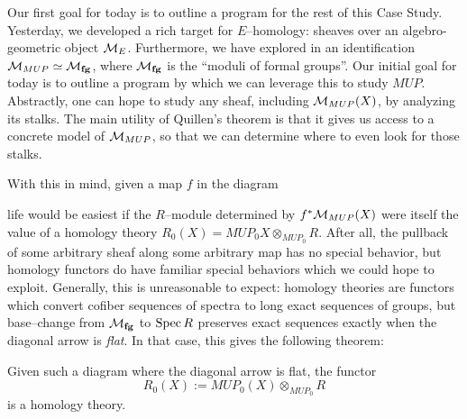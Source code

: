 Our first goal for today is to outline a program for the rest of this Case Study.  Yesterday, we developed a rich target for $E$--homology: sheaves over an algebro-geometric object $\mathcal{M}_{E}$.  Furthermore, we have explored in  an identification $\mathcal{M}_{MUP} \simeq \mathcal{M}_{\mathbf{fg}}$, where $\mathcal{M}_{\mathbf{fg}}$ is the ``moduli of formal groups''.  Our initial goal for today is to outline a program by which we can leverage this to study $MUP$.  Abstractly, one can hope to study any sheaf, including $\mathcal{M}_{MUP}(X)$, by analyzing its stalks.  The main utility of Quillen's theorem is that it gives us access to a concrete model of $\mathcal{M}_{MUP}$, so that we can determine where to even look for those stalks.

With this in mind, given a map $f$ in the diagram
\begin{center}
\end{center}
life would be easiest if the $R$--module determined by $f^* \mathcal{M}_{MUP}(X)$ were itself the value of a homology theory $R_0(X) = MUP_0 X \otimes_{MUP_0} R$.  After all, the pullback of some arbitrary sheaf along some arbitrary map has no special behavior, but homology functors do have familiar special behaviors which we could hope to exploit.  Generally, this is unreasonable to expect: homology theories are functors which convert cofiber sequences of spectra to long exact sequences of groups, but base--change from $\mathcal{M}_{\mathbf{fg}}$ to $\operatorname{Spec} R$ preserves exact sequences exactly when the diagonal arrow is \textit{flat}.  In that case, this gives the following theorem:

\begin{theorem}[Landweber]\label{LandwebersStackyTheorem}
Given such a diagram where the diagonal arrow is flat, the functor \[R_0(X) := MUP_0(X) \otimes_{MUP_0} R\] is a homology theory. 
\end{theorem}


